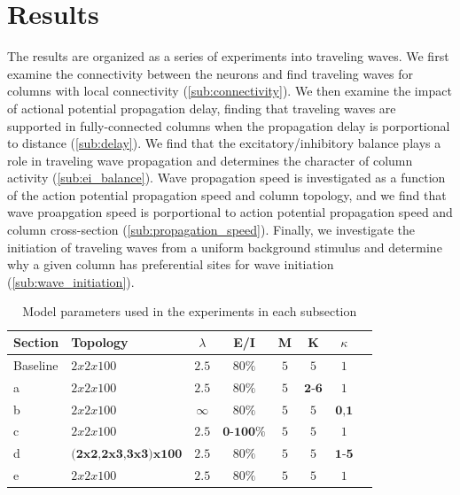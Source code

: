 \documentclass[a4paper,11pt]{article}
\begin{document}
\section{Results}
The results are organized as a series of experiments into traveling waves.
We first examine the connectivity between the neurons and find traveling waves for columns with local connectivity (\ref{sub:connectivity}).
We then examine the impact of actional potential propagation delay, finding that traveling waves are supported in fully-connected columns when the propagation delay is porportional to distance (\ref{sub:delay}).
We find that the excitatory/inhibitory balance plays a role in traveling wave propagation and determines the character of column activity (\ref{sub:ei_balance}).
Wave propagation speed is investigated as a function of the action potential propagation speed and column topology, and we find that wave proapgation speed is porportional to action potential propagation speed and column cross-section (\ref{sub:propagation_speed}).
Finally, we investigate the initiation of traveling waves from a uniform background stimulus and determine why a given column has preferential sites for wave initiation (\ref{sub:wave_initiation}).

\begin{table}[!h]
 \caption{Model parameters used in the experiments in each subsection}
 \label{tab:experiment_params}
 \centering
 \begin{tabularx}{\textwidth}{l | X | c | c | c | c | c | r}
  \textbf{Section} & \textbf{Topology} & \textbf{$\lambda$} & \textbf{E/I} & \textbf{M} & \textbf{K} & \textbf{$\kappa$} \\
  \hline
  Baseline & $2x2x100$ & $2.5$ & $80\%$ & $5$ & $5$ & $1$ \\ 
  a & $2x2x100$ & $2.5$ & $80\%$ & $5$ & $\textbf{2-6}$ & $1$ \\ 
  b & $2x2x100$ & $\infty$ & $80\%$ & $5$ & $5$ & $\textbf{0,1}$ \\ 
  c & $2x2x100$ & $2.5$ & $\textbf{0-100}\%$ & $5$ & $5$ & $1$ \\ 
  d & $\textbf{(2x2,2x3,3x3)x100}$ & $2.5$ & $80\%$ & $5$ & $5$ & $\textbf{1-5}$ \\ 
  e & $2x2x100$ & $2.5$ & $80\%$ & $5$ & $5$ & $1$ \\ 
 \end{tabularx}
\end{table}
\end{document}
